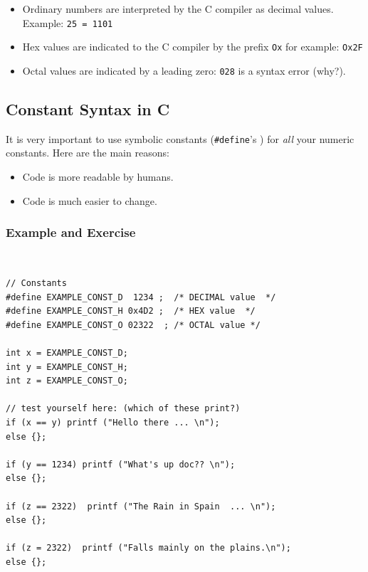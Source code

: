 \begin{itemize}
  \item
  Ordinary numbers are interpreted by the C compiler
          as decimal values.   Example: {\tt 25 = 1101}

  \item Hex values are indicated to the C compiler by the
              prefix {\tt Ox} for example:   {\tt Ox2F}

  \item Octal values are indicated by a leading zero: {\tt 028}
            is a syntax error (why?).

\end{itemize}



\subsection{Constant Syntax in C}

It is very important to use symbolic constants ({\tt \#define}'s )
for {\em all} your numeric constants.  Here are the
main reasons:
\begin{itemize}
        \item Code is more readable by humans.
        \item Code is much easier to change.
\end{itemize}

\subsubsection{Example and Exercise}
{\small\tt
\begin{verbatim}
// Constants
#define EXAMPLE_CONST_D  1234 ;  /* DECIMAL value  */
#define EXAMPLE_CONST_H 0x4D2 ;  /* HEX value  */
#define EXAMPLE_CONST_O 02322  ; /* OCTAL value */

int x = EXAMPLE_CONST_D;
int y = EXAMPLE_CONST_H;
int z = EXAMPLE_CONST_O;

// test yourself here: (which of these print?)
if (x == y) printf ("Hello there ... \n");
else {};

if (y == 1234) printf ("What's up doc?? \n");
else {};

if (z == 2322)  printf ("The Rain in Spain  ... \n");
else {};

if (z = 2322)  printf ("Falls mainly on the plains.\n");
else {};

\end{verbatim}
}

